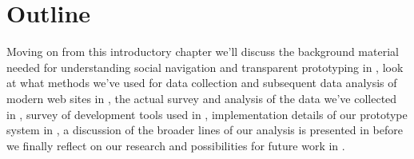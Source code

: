\section{Outline}

Moving on from this introductory chapter we'll discuss the background
material needed for understanding social navigation and transparent
prototyping in ,
look at what methods we've used for data collection and subsequent data
analysis of modern web sites
in ,
the actual survey and analysis of the data we've collected in
,
survey of development tools used in
,
implementation details of our prototype system in
,
a discussion of the broader lines of our analysis is presented in
before we finally reflect on our research and possibilities for future work
in .
